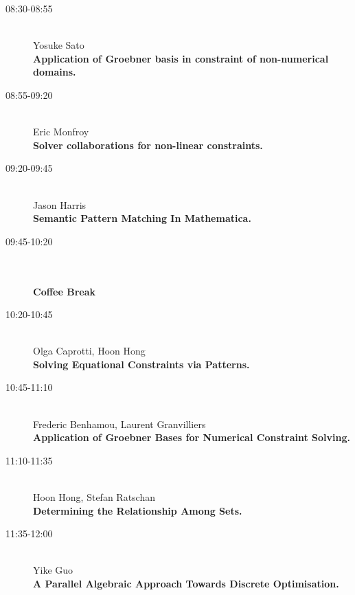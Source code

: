 \begin{description}
\item[08:30-08:55] \ \\
  Yosuke Sato\\
  {\bf Application of Groebner basis in constraint of non-numerical domains.} 
\item[08:55-09:20] \ \\
  Eric Monfroy\\
  {\bf Solver collaborations for non-linear constraints.
} 
\item[09:20-09:45] \ \\
  Jason Harris\\
  {\bf Semantic Pattern Matching In Mathematica.
} 
\item[09:45-10:20] \ \\
  \ \\
  {\bf Coffee Break}
\item[10:20-10:45 ] \ \\
  Olga Caprotti, Hoon Hong\\
  {\bf Solving Equational Constraints via Patterns.} 
\item[10:45-11:10] \ \\
  Frederic Benhamou, Laurent Granvilliers
\\
  {\bf Application of Groebner Bases for Numerical Constraint Solving.
} 
\item[11:10-11:35] \ \\
  Hoon Hong, Stefan Ratschan\\
  {\bf Determining the Relationship Among Sets.} 


\item[11:35-12:00] \ \\
  Yike Guo\\
  {\bf A Parallel Algebraic Approach Towards Discrete Optimisation.}
\end{description}

